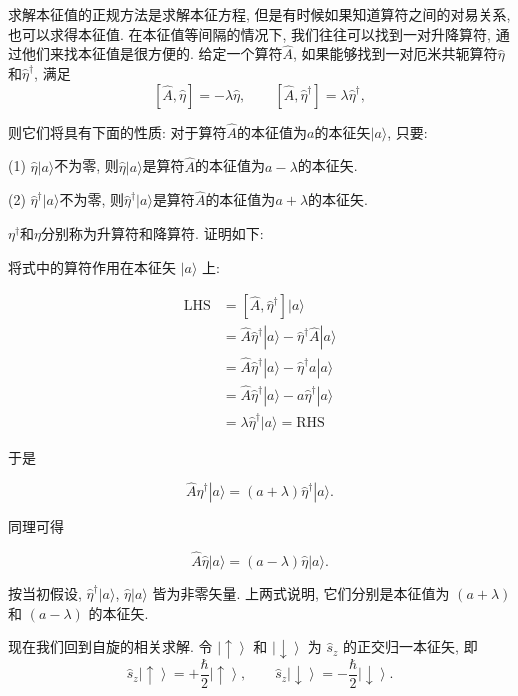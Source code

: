 求解本征值的正规方法是求解本征方程, 但是有时候如果知道算符之间的对易关系, 也可以求得本征值. 在本征值等间隔的情况下, 我们往往可以找到一对升降算符, 通过他们来找本征值是很方便的. 给定一个算符$\hat A$, 如果能够找到一对厄米共轭算符$\hat \eta$和$\hat \eta^{\dagger}$, 满足
\[
[\hat A, \hat \eta] = -\lambda \hat \eta,
\qquad
[\hat A, \hat \eta^{\dagger}] = \lambda \hat \eta^{\dagger},
\]

则它们将具有下面的性质: 对于算符$\hat A$的本征值为$a$的本征矢$| a \rangle$, 只要:

(1) $\hat \eta | a \rangle$不为零, 则$\hat \eta | a \rangle$是算符$\hat A$的本征值为$a-\lambda$的本征矢.

(2) $\hat \eta^{\dagger} | a \rangle$不为零, 则$\hat \eta^{\dagger} | a \rangle$是算符$\hat A$的本征值为$a+\lambda$的本征矢.

$\eta^{\dagger}$和$\eta$分别称为升算符和降算符. 证明如下:

将式中的算符作用在本征矢 $|a\rangle$ 上:

\[
\begin{aligned}
\mathrm{LHS} &= [\hat{A}, \hat{\eta}^{\dagger}]|a\rangle \\
&= \hat{A}\hat{\eta}^{\dagger}|a\rangle
 - \hat{\eta}^{\dagger}\hat{A}|a\rangle \\
&= \hat{A}\hat{\eta}^{\dagger}|a\rangle
 - \hat{\eta}^{\dagger}a|a\rangle \\
&= \hat{A}\hat{\eta}^{\dagger}|a\rangle
 - a\hat{\eta}^{\dagger}|a\rangle \\
&= \lambda \hat{\eta}^{\dagger}|a\rangle = \mathrm{RHS}
\end{aligned}
\]


于是

\[
\hat{A}\hat{\eta}^{\dagger}|a\rangle
=
(a+\lambda)\hat{\eta}^{\dagger}|a\rangle .
\]

同理可得

\[
\hat{A}\hat{\eta}|a\rangle
=
(a-\lambda)\hat{\eta}|a\rangle .
\]

按当初假设, $\hat{\eta}^{\dagger}|a\rangle$, $\hat{\eta}|a\rangle$
皆为非零矢量. 上两式说明, 它们分别是本征值为
$(a+\lambda)$ 和 $(a-\lambda)$ 的本征矢.

现在我们回到自旋的相关求解. 令 $\left|\uparrow\right\rangle$ 和 $\left|\downarrow\right\rangle$ 为
$\hat{s}_z$ 的正交归一本征矢, 即
\[
\hat{s}_z\left|\uparrow\right\rangle
=
+\frac{\hbar}{2}\left|\uparrow\right\rangle,
\qquad
\hat{s}_z\left|\downarrow\right\rangle
=
-\frac{\hbar}{2}\left|\downarrow\right\rangle .
\]

